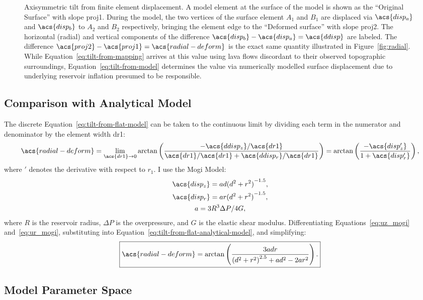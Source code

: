 \begin{figure}
    
    \caption[Calculation of \acf{radial-deform} from modelling]{Axisymmetric tilt from finite element displacement. A model element at the surface of the model is shown as the ``Original Surface'' with slope \acs{proj1}. During the model, the two vertices of the surface element $A_1$ and $B_1$ are displaced via $\acs{disp_a}$ and $\acs{disp_b}$ to $A_2$ and $B_2$ respectively, bringing the element edge to the ``Deformed surface'' with slope \acs{proj2}. The horizontal (radial) and vertical components of the difference $\acs{disp_b} - \acs{disp_a} = \acs{ddisp}$ are labeled. The difference $\acs{proj2}-\acs{proj1}=\acs{radial-deform}$ is the exact same quantity illustrated in Figure~\ref{fig:radial}. While Equation~\eqref{eq:tilt-from-mapping} arrives at this value using lava flows discordant to their observed topographic surroundings, Equation~\eqref{eq:tilt-from-model} determines the value via numerically modelled surface displacement due to underlying reservoir inflation presumed to be responsible.}%
    \label{fig:tilt-from-model}
\end{figure}

\subsection{Comparison with Analytical Model}
The discrete Equation~\eqref{eq:tilt-from-flat-model} can be taken to the continuous limit by dividing each term in the numerator and denominator by the element width \acs{dr1}:
\begin{equation}
\acs{radial-deform}
    = \lim_{\acs{dr1}\to0} 
    \arctan\left(\dfrac{-\acs{ddisp_z}/\acs{dr1}}{\acs{dr1}/\acs{dr1}
    + \acs{ddisp_r}/\acs{dr1}}\right) = 
    \arctan\left(\dfrac{-\acs{disp_z'}}{1+\acs{disp_r'}}\right),\label{eq:tilt-from-flat-analytical-model}
\end{equation}
where $'$ denotes the derivative with respect to $r_1$. I use the Mogi Model:
\begin{gather}
    \acs{disp_z} = ad{(d^2+r^2)}^{-1.5},\label{eq:uz_mogi}\\
    \acs{disp_r} = ar{(d^2+r^2)}^{-1.5},\label{eq:ur_mogi}\\
    a = {3R^3\Delta P}/{4G},\nonumber
\end{gather}
where $R$ is the reservoir radius, $\Delta P$ is the overpressure, and $G$ is the elastic shear modulus. Differentiating Equations~\eqref{eq:uz_mogi} and~\eqref{eq:ur_mogi}, substituting into Equation~\eqref{eq:tilt-from-flat-analytical-model}, and simplifying:
\begin{equation}
    \boxed{\acs{radial-deform} = \arctan\left(\frac{3adr}{{(d^2+r^2)}^{2.5}+ad^2-2ar^2}\right).}\label{eq:tilt-from-mogi-model}
\end{equation}

\subsection{Model Parameter Space}

